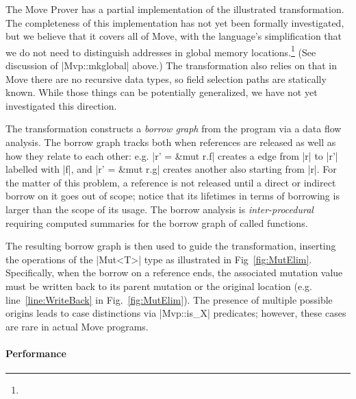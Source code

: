  The Move Prover has a partial implementation of the
illustrated transformation.  The completeness of this implementation has not yet
been formally investigated, but we believe that it covers all of Move, with the
language's simplification that we do not need to distinguish addresses in global
memory locations.\footnote{} (See
discussion of |Mvp::mkglobal| above.) The transformation also relies on that in
Move there are no recursive data types, so field selection paths are statically
known. While those things can be potentially generalized, we have not yet
investigated this direction.

The transformation constructs a \emph{borrow graph} from the program via a data
flow analysis. The borrow graph tracks both when references are released as well
as how they relate to each other: e.g. |r' = &mut r.f| creates a edge from |r|
to |r'| labelled with |f|, and |r' = &mut r.g| creates another also starting
from |r|. For the matter of this problem, a reference is not released until a
direct or indirect borrow on it goes out of scope; notice that its lifetimes in
terms of borrowing is larger than the scope of its usage. The borrow analysis is
\emph{inter-procedural} requiring computed summaries for the borrow graph of
called functions.

The resulting borrow graph is then used to guide the transformation, inserting
the operations of the |Mut<T>| type as illustrated in
Fig~\ref{fig:MutElim}. Specifically, when the borrow on a reference ends, the
associated mutation value must be written back to its parent mutation or the
original location (e.g. line~\ref{line:WriteBack} in
Fig.~\ref{fig:MutElim}). The presence of multiple possible origins leads to case
distinctions via |Mvp::is_X| predicates; however, these cases are rare in actual
Move programs.

\paragraph{Performance}




